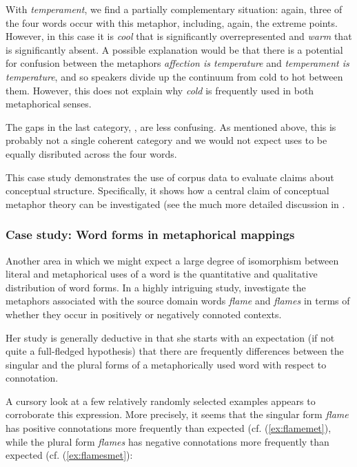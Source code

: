 With \textit{temperament}, we find a partially complementary situation: again, three of the four words occur with this metaphor,  including, again, the extreme points. However, in this case it is \textit{cool} that is significantly overrepresented and \textit{warm} that is significantly absent. A possible explanation would be that there is a potential for confusion between the metaphors \textit{affection is temperature} and \textit{temperament is temperature}, and so speakers divide up the continuum from cold to hot between them. However, this does not explain why \textit{cold} is frequently used in both metaphorical senses.

The gaps in the last category, , are less confusing. As mentioned above, this is probably not a single coherent category and we would not expect uses to be equally disributed across the four words.

This case study demonstrates the use of corpus data to evaluate claims about conceptual structure. Specifically, it shows how a central claim of conceptual metaphor  theory can be investigated (see the much more detailed discussion in \citet{deignan_metaphorical_1999}.

\subsubsection{Case study: Word forms in metaphorical mappings}
\label{sec:flamevsflames}

Another area in which we might expect a large degree of isomorphism between literal  and metaphorical  uses of a word is the quantitative and qualitative distribution  of word forms. In a highly intriguing study, \citet{stefanowitsch_grammar_2006} investigate the metaphors associated  with the source domain words \textit{flame} and \textit{flames} in terms of whether they occur in positively or negatively connoted  contexts.

Her study is generally deductive  in that she starts with an expectation (if not quite a full\hyp{}fledged hypothesis) that there are frequently differences between the singular  and the plural forms of a metaphorically  used word with respect to  connotation.

A cursory look at a few relatively randomly  selected examples appears to corroborate this expression. More precisely, it seems that the singular form \textit{flame} has positive connotations  more frequently than expected  (cf. (\ref{ex:flamemet}), while the plural  form \textit{flames} has negative connotations  more frequently than expected (cf. (\ref{ex:flamesmet}):


